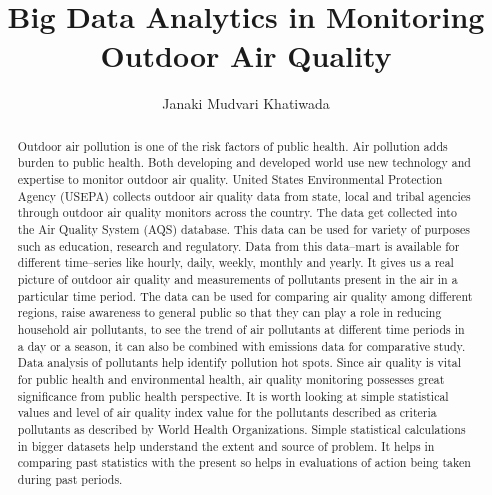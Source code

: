 \documentclass[sigconf]{acmart}
\begin{document}
\title{Big Data Analytics in Monitoring  Outdoor Air Quality}


\author{Janaki Mudvari Khatiwada}






\begin{abstract}
   Outdoor air pollution is one of the risk factors of public health. Air pollution adds burden to public health. Both developing and developed world use new technology and expertise to monitor outdoor air quality. 
   United States Environmental Protection Agency (USEPA) collects outdoor air quality data from state, local and tribal agencies through outdoor air quality monitors across the country. The data get collected into the Air Quality System (AQS) database. This data can be used for variety of purposes such as education, research and regulatory. Data from this data--mart is available for different time--series like hourly, daily, weekly, monthly and yearly. It gives us a real picture of outdoor air quality and measurements of pollutants present in the air in a particular time period. The data can be used for comparing air quality among different regions, raise awareness to general public so that they can play a role in reducing household air pollutants, to see the trend of air pollutants at different time periods in a day or a season, it can also be combined with emissions data for comparative study. Data analysis of pollutants help identify pollution hot spots. Since air quality is vital for public health and environmental health, air quality monitoring possesses great significance from public health perspective. It is worth looking at simple statistical values and level of air quality index value for the pollutants described as criteria pollutants as described by World Health Organizations. Simple statistical calculations in bigger datasets help understand the extent and source of problem. It helps in comparing past statistics with the present so helps in evaluations of action being taken during past periods. 


\end{abstract}



\maketitle
\end{document}
